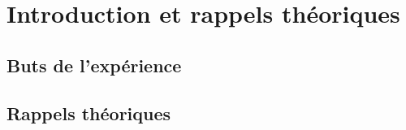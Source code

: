 

\section{Introduction et rappels théoriques}

\subsection{Buts de l'expérience}

\subsection{Rappels théoriques}




